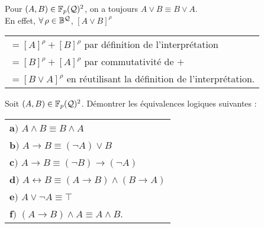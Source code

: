 		\begin{Exemple}
			Pour \((A,B) \in \mathbb{F}_p(\mathcal{Q})^2\), on a toujours \(A \vee B \equiv B \vee A\). \\
			En effet, \(\forall \, \rho \in \mathbb{B}^{\mathcal{Q}}\), \([A \vee B]^\rho\) \hspace{-3mm}
				\begin{tabular}[t]{l}
					\(= [A]^\rho + [B]^\rho\) par définition de l'interprétation\\
					\(= [B]^\rho + [A]^\rho\) par commutativité de \(+\) \\
					\(= [B \vee A]^\rho\) en réutilisant la définition de l'interprétation.
				\end{tabular}
		\end{Exemple}
		
		\colsep{1.5pt}
		\begin{Exercice}
			Soit \((A,B) \in \mathbb{F}_p(\mathcal{Q})^2\). Démontrer les équivalences logiques suivantes : \\
			\begin{tabular}[t]{l}
				\bdot \(\bm{a)}\) \(A \wedge B \equiv B \wedge A\) \\
				\bdot \(\bm{b)}\) \(A \rightarrow B \equiv (\neg A) \vee B\) \\
				\bdot \(\bm{c)}\) \(A \rightarrow B \equiv (\neg B) \rightarrow (\neg A)\) \\
				\bdot \(\bm{d)}\) \(A \leftrightarrow B \equiv (A \rightarrow B) \wedge (B \rightarrow A)\) \\
				\bdot \(\bm{e)}\) \(A \vee \neg A \equiv \top\) \\
				\bdot \(\bm{f)}\) \((A \rightarrow B) \wedge A \equiv A \wedge B\).
			\end{tabular}
		\end{Exercice}
		
